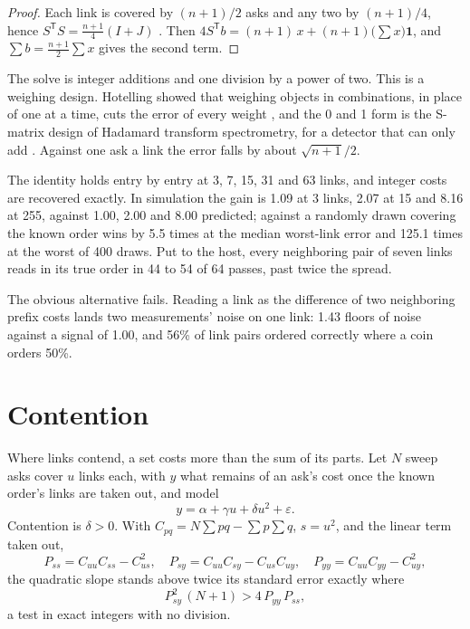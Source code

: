\begin{proof}
Each link is covered by \((n+1)/2\) asks and any two by \((n+1)/4\), hence
\(S^{\mathsf T}S = \tfrac{n+1}{4}(I + J)\) \cite{src:Sloane-Harwit}. Then
\(4S^{\mathsf T}b = (n+1)\,x + (n+1)\bigl(\sum x\bigr)\mathbf 1\), and
\(\sum b = \tfrac{n+1}{2}\sum x\) gives the second term.
\end{proof}

The solve is integer additions and one division by a power of two. This is a weighing design.
Hotelling showed that weighing objects in combinations, in place of one at a time, cuts the
error of every weight \cite{src:Hotelling}, and the 0 and 1 form is the S-matrix design of
Hadamard transform spectrometry, for a detector that can only add \cite{src:Sloane-Harwit}.
Against one ask a link the error falls by about \(\sqrt{n+1}/2\).

The identity holds entry by entry at 3, 7, 15, 31 and 63 links, and integer costs are recovered
exactly. In simulation the gain is 1.09 at 3 links, 2.07 at 15 and 8.16 at 255, against 1.00,
2.00 and 8.00 predicted; against a randomly drawn covering the known order wins by 5.5 times at
the median worst-link error and 125.1 times at the worst of 400 draws. Put to the host, every
neighboring pair of seven links reads in its true order in 44 to 54 of 64 passes, past twice the
spread.

The obvious alternative fails. Reading a link as the difference of two neighboring prefix costs
lands two measurements' noise on one link: 1.43 floors of noise against a signal of 1.00, and
56\% of link pairs ordered correctly where a coin orders 50\%.

\section{Contention}

Where links contend, a set costs more than the sum of its parts. Let \(N\) sweep asks cover
\(u\) links each, with \(y\) what remains of an ask's cost once the known order's links are taken
out, and model
\[
  y = \alpha + \gamma u + \delta u^2 + \varepsilon .
\]
Contention is \(\delta > 0\). With \(C_{pq} = N\sum pq - \sum p \sum q\), \(s = u^2\), and the
linear term taken out,
\[
  P_{ss} = C_{uu}C_{ss} - C_{us}^2, \quad P_{sy} = C_{uu}C_{sy} - C_{us}C_{uy}, \quad
  P_{yy} = C_{uu}C_{yy} - C_{uy}^2,
\]
the quadratic slope stands above twice its standard error exactly where
\[
  P_{sy}^2\,(N+1) > 4\,P_{yy}\,P_{ss},
\]
a test in exact integers with no division.

